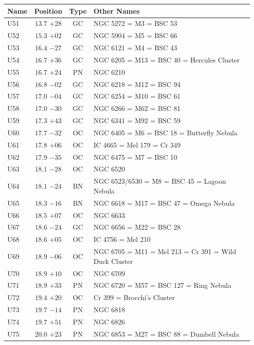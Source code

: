 \begin{table}[t]
    \setlength{\tabcolsep}{2pt}
    \footnotesize
    \begin{tabularx}{\linewidth}{lccX}
        \hline
        Name&Position&Type&Other Names\\
        \hline

U51  &$13.7$ $+28$&GC &NGC 5272 = M3 = BSC 53\\
U52  &$15.3$ $+02$&GC &NGC 5904 = M5 = BSC 66\\
U53  &$16.4$ $-27$&GC &NGC 6121 = M4 = BSC 43\\
U54  &$16.7$ $+36$&GC &NGC 6205 = M13 = BSC 40 = Hercules Cluster\\
U55  &$16.7$ $+24$&PN &NGC 6210\\
U56  &$16.8$ $-02$&GC &NGC 6218 = M12 = BSC 94\\
U57  &$17.0$ $-04$&GC &NGC 6254 = M10 = BSC 61\\
U58  &$17.0$ $-30$&GC &NGC 6266 = M62 = BSC 81\\
U59  &$17.3$ $+43$&GC &NGC 6341 = M92 = BSC 59\\
U60  &$17.7$ $-32$&OC &NGC 6405 = M6 = BSC 18 = Butterfly Nebula\\
U61  &$17.8$ $+06$&OC &IC 4665 = Mel 179 = Cr 349\\
U62  &$17.9$ $-35$&OC &NGC 6475 = M7 = BSC 10\\
U63  &$18.1$ $-28$&OC &NGC 6520\\
U64  &$18.1$ $-24$&BN &NGC 6523/6530 = M8 = BSC 45 = Lagoon Nebula\\
U65  &$18.3$ $-16$&BN &NGC 6618 = M17 = BSC 47 = Omega Nebula\\
U66  &$18.5$ $+07$&OC &NGC 6633\\
U67  &$18.6$ $-24$&GC &NGC 6656 = M22 = BSC 28\\
U68  &$18.6$ $+05$&OC &IC 4756 = Mel 210\\
U69  &$18.9$ $-06$&OC &NGC 6705 = M11 = Mel 213 = Cr 391 = Wild Duck Cluster\\
U70  &$18.9$ $+10$&OC &NGC 6709\\
U71  &$18.9$ $+33$&PN &NGC 6720 = M57 = BSC 127 = Ring Nebula\\
U72  &$19.4$ $+20$&OC &Cr 399 = Brocchi's Cluster\\
U73  &$19.7$ $-14$&PN &NGC 6818\\
U74  &$19.7$ $+51$&PN &NGC 6826\\
U75  &$20.0$ $+23$&PN &NGC 6853 = M27 = BSC 88 = Dumbell Nebula\\

\end{tabularx}
\end{table}
